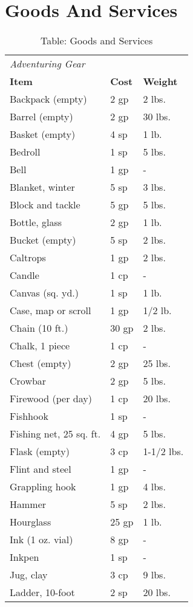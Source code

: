 \section{Goods And Services}
\begin{table}[]
\caption{Table: Goods and Services}
\begin{tabular}{lll}
\textit{Adventuring Gear}\\
\textbf{Item} & \textbf{Cost} & \textbf{Weight}\\
Backpack (empty) & 2 gp & 2 lbs. \\
 Barrel (empty) & 2 gp & 30 lbs. \\
 Basket (empty) & 4 sp & 1 lb. \\
 Bedroll & 1 sp & 5 lbs. \\
 Bell & 1 gp & - \\
 Blanket, winter & 5 sp & 3 lbs. \\
 Block and tackle & 5 gp & 5 lbs. \\
 Bottle, glass & 2 gp & 1 lb. \\
 Bucket (empty) & 5 sp & 2 lbs. \\
 Caltrops & 1 gp & 2 lbs. \\
 Candle & 1 cp & - \\
 Canvas (sq. yd.) & 1 sp & 1 lb. \\
 Case, map or scroll & 1 gp & 1/2 lb. \\
 Chain (10 ft.) & 30 gp & 2 lbs. \\
 Chalk, 1 piece & 1 cp & - \\
 Chest (empty) & 2 gp & 25 lbs. \\
 Crowbar & 2 gp & 5 lbs. \\
 Firewood (per day) & 1 cp & 20 lbs. \\
 Fishhook & 1 sp & - \\
 Fishing net, 25 sq. ft. & 4 gp & 5 lbs. \\
 Flask (empty) & 3 cp & 1-1/2 lbs. \\
 Flint and steel & 1 gp & - \\
 Grappling hook & 1 gp & 4 lbs. \\
 Hammer & 5 sp & 2 lbs. \\
 Hourglass & 25 gp & 1 lb. \\
 Ink (1 oz. vial) & 8 gp & - \\
 Inkpen & 1 sp & - \\
 Jug, clay & 3 cp & 9 lbs. \\
 Ladder, 10-foot & 2 sp & 20 lbs. \\

\end{tabular}
\end{table}
